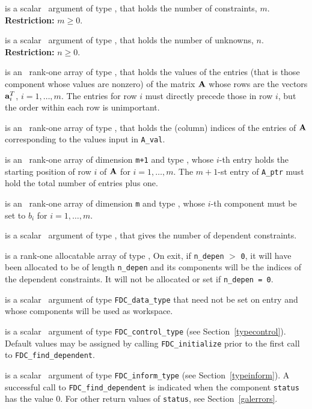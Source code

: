 \documentclass{galahad}
\newcommand{\packagename}{FDC}
\begin{document}
\begin{description}

 is a scalar \intentin\ argument of type \integer,
that holds the number of constraints, $m$.
{\bf Restriction: } $m \geq 0$.

 is a scalar \intentin\ argument of type \integer,
that holds the number of unknowns, $n$.
{\bf Restriction: } $n \geq 0$.

 is an \intentin\ rank-one array of type \realdp, that holds
the values of the entries (that is those component whose values are nonzero)
of the matrix ${\mathbf{A}}$ whose rows are the vectors ${\mathbf{a}}_i^T$, $i = 1, \ldots, m$.
The entries for row $i$ must directly precede those in row $i$, but the
order within each row is unimportant.

 is an \intentin\ rank-one array of type \integer, that 
holds the (column) indices of the entries of ${\mathbf{A}}$ corresponding to the
values input in {\tt A\_val}.

 is an \intentin\ rank-one array of dimension {\tt m+1} and type
\integer, whose $i$-th entry holds the starting position of row $i$
of ${\mathbf{A}}$ for $i = 1, \ldots, m$. The $m+1$-st entry of {\tt A\_ptr}
must hold the total number of entries plus one.

 is an \intentin\ rank-one array of dimension {\tt m} and
type \realdp, whose $i$-th component must be set to $b_i$ for
$i = 1, \ldots, m$.

 is a scalar \intentout\ argument of type \integer,
that gives the number of dependent constraints.

 is a rank-one allocatable array of type \integer,
On exit, if {\tt n\_depen} $>$ {\tt 0}, it will have been allocated to be of
length {\tt n\_depen} and its components will be the indices of the dependent
constraints. It will not be allocated or set if {\tt n\_depen = 0}.

 is a scalar \intentinout\ argument of type
{\tt \packagename\_data\_type}
that need not be set on entry and whose components will be used as workspace.

 is a scalar \intentin\ argument of type
{\tt \packagename\_control\_type}
(see Section~\ref{typecontrol}). Default values may be assigned by calling
{\tt \packagename\_initialize} prior to the first call to
{\tt \packagename\_find\_dependent}.

 is a scalar \intentinout\ argument of type
{\tt \packagename\_inform\_type}
(see Section~\ref{typeinform}). A successful call to
{\tt \packagename\_find\_dependent}
is indicated when the  component {\tt status} has the value 0.
For other return values of {\tt status}, see Section~\ref{galerrors}.

\end{description}
\end{document}
